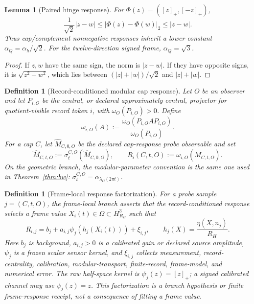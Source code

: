 \documentclass[11pt]{article}
\newtheorem{lemma}[theorem]{Lemma}
\newtheorem{definition}[theorem]{Definition}
\begin{document}
\begin{lemma}[Paired hinge response]\label{lem:paired-hinge-response}
For \(\Phi(z)=([z]_+,[-z]_+)\),
\[
\frac1{\sqrt2}|z-w|\leq |\Phi(z)-\Phi(w)|_2\leq |z-w|.
\]
Thus cap/complement nonnegative responses inherit a lower constant
\(\alpha_Q=\alpha_h/\sqrt2\). For the twelve-direction signed frame,
\(\alpha_Q=\sqrt3\).
\end{lemma}

\begin{proof}
If \(z,w\) have the same sign, the norm is \(|z-w|\). If they have opposite
signs, it is \(\sqrt{z^2+w^2}\), which lies between
\((|z|+|w|)/\sqrt2\) and \(|z|+|w|\).
\end{proof}

\begin{definition}[Record-conditioned modular cap response]
\label{def:record-conditioned-modular-cap-response}
Let \(O\) be an observer and let \(P_{i,O}\) be the central, or declared
approximately central, projector for quotient-visible record token \(i\), with
\(\omega_O(P_{i,O})>0\). Define
\[
\omega_{i,O}(A):=\frac{\omega_O(P_{i,O}AP_{i,O})}{\omega_O(P_{i,O})}.
\]
For a cap \(C\), let \(\widehat M_{C,0,O}\) be the declared cap-response probe
observable and set
\[
\widehat M_{C,t,O}:=\sigma_t^{C,O}(\widehat M_{C,0,O}),\qquad
R_i(C,t,O):=\omega_{i,O}(\widehat M_{C,t,O}).
\]
On the geometric branch, the modular-parameter convention is the same one used in
Theorem~\ref{thm:bw}: \(\sigma_t^{C,O}=\alpha_{\lambda_C(2\pi t)}\).
\end{definition}

\begin{definition}[Frame-local response factorization]
\label{def:point-local-cap-response-factorization}
For a probe sample \(j=(C,t,O)\), the frame-local branch asserts that the record-conditioned
response selects a frame value \(X_i(t)\in\Omega\subset H^3_{R_H}\) such that
\[
R_{i,j}=b_j+a_{i,j}\psi_j(h_j(X_i(t)))+\xi_{i,j},
\qquad
h_j(X)=\frac{\eta(X,n_j)}{R_H}.
\]
Here \(b_j\) is background, \(a_{i,j}>0\) is a calibrated gain or declared
source amplitude, \(\psi_j\) is a frozen scalar sensor kernel, and \(\xi_{i,j}\)
collects measurement, record-centrality, calibration, modular-transport,
finite-record, frame-model, and numerical error. The raw half-space kernel is
\(\psi_j(z)=[z]_+\); a signed calibrated channel may use \(\psi_j(z)=z\). This
factorization is a branch hypothesis or finite frame-response receipt, not a
consequence of fitting a frame value.
\end{definition}
\end{document}
